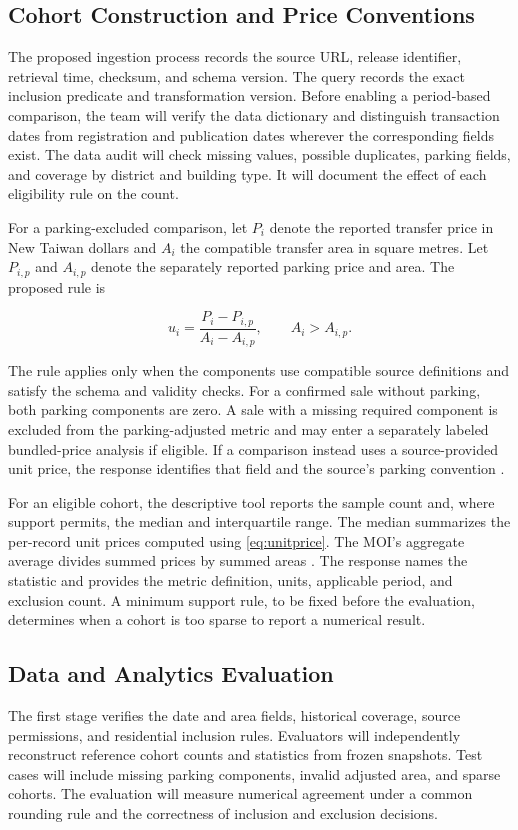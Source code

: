 \subsection{Cohort Construction and Price Conventions}
The proposed ingestion process records the source URL, release identifier, retrieval time, checksum, and schema version. The query records the exact inclusion predicate and transformation version. Before enabling a period-based comparison, the team will verify the data dictionary and distinguish transaction dates from registration and publication dates wherever the corresponding fields exist. The data audit will check missing values, possible duplicates, parking fields, and coverage by district and building type. It will document the effect of each eligibility rule on the count.

For a parking-excluded comparison, let \(P_i\) denote the reported transfer price in New Taiwan dollars and \(A_i\) the compatible transfer area in square metres. Let \(P_{i,p}\) and \(A_{i,p}\) denote the separately reported parking price and area. The proposed rule is

\begin{equation}
u_i = \frac{P_i-P_{i,p}}{A_i-A_{i,p}},
\qquad A_i>A_{i,p}.
\label{eq:unitprice}
\end{equation}

The rule applies only when the components use compatible source definitions and satisfy the schema and validity checks. For a confirmed sale without parking, both parking components are zero. A sale with a missing required component is excluded from the parking-adjusted metric and may enter a separately labeled bundled-price analysis if eligible. If a comparison instead uses a source-provided unit price, the response identifies that field and the source's parking convention \cite{moi}.

For an eligible cohort, the descriptive tool reports the sample count and, where support permits, the median and interquartile range. The median summarizes the per-record unit prices computed using \eqref{eq:unitprice}. The MOI's aggregate average divides summed prices by summed areas \cite{moi}. The response names the statistic and provides the metric definition, units, applicable period, and exclusion count. A minimum support rule, to be fixed before the evaluation, determines when a cohort is too sparse to report a numerical result.

\subsection{Data and Analytics Evaluation}
The first stage verifies the date and area fields, historical coverage, source permissions, and residential inclusion rules. Evaluators will independently reconstruct reference cohort counts and statistics from frozen snapshots. Test cases will include missing parking components, invalid adjusted area, and sparse cohorts. The evaluation will measure numerical agreement under a common rounding rule and the correctness of inclusion and exclusion decisions.

